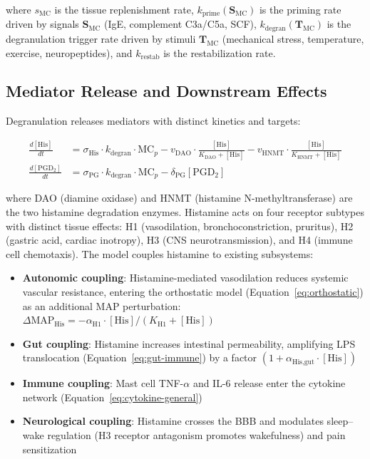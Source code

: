 where $s_{\text{MC}}$ is the tissue replenishment rate, $k_{\text{prime}}(\boldsymbol{S}_{\text{MC}})$ is the priming rate driven by signals $\boldsymbol{S}_{\text{MC}}$ (IgE, complement C3a/C5a, SCF), $k_{\text{degran}}(\boldsymbol{T}_{\text{MC}})$ is the degranulation trigger rate driven by stimuli $\boldsymbol{T}_{\text{MC}}$ (mechanical stress, temperature, exercise, neuropeptides), and $k_{\text{restab}}$ is the restabilization rate.

\subsection{Mediator Release and Downstream Effects}

Degranulation releases mediators with distinct kinetics and targets:

\begin{align}
\label{eq:histamine-dynamics}
\frac{d[\text{His}]}{dt} &= \sigma_{\text{His}} \cdot k_{\text{degran}} \cdot \text{MC}_p - v_{\text{DAO}} \cdot \frac{[\text{His}]}{K_{\text{DAO}} + [\text{His}]} - v_{\text{HNMT}} \cdot \frac{[\text{His}]}{K_{\text{HNMT}} + [\text{His}]} \\
\frac{d[\text{PGD}_2]}{dt} &= \sigma_{\text{PG}} \cdot k_{\text{degran}} \cdot \text{MC}_p - \delta_{\text{PG}} [\text{PGD}_2]
\end{align}

where DAO (diamine oxidase) and HNMT (histamine N-methyltransferase) are the two histamine degradation enzymes. Histamine acts on four receptor subtypes with distinct tissue effects: H1 (vasodilation, bronchoconstriction, pruritus), H2 (gastric acid, cardiac inotropy), H3 (CNS neurotransmission), and H4 (immune cell chemotaxis). The model couples histamine to existing subsystems:

\begin{itemize}
    \item \textbf{Autonomic coupling}: Histamine-mediated vasodilation reduces systemic vascular resistance, entering the orthostatic model (Equation~\ref{eq:orthostatic}) as an additional MAP perturbation: $\Delta\text{MAP}_{\text{His}} = -\alpha_{\text{H1}} \cdot [\text{His}] / (K_{\text{H1}} + [\text{His}])$
    \item \textbf{Gut coupling}: Histamine increases intestinal permeability, amplifying LPS translocation (Equation~\ref{eq:gut-immune}) by a factor $(1 + \alpha_{\text{His,gut}} \cdot [\text{His}])$
    \item \textbf{Immune coupling}: Mast cell TNF-$\alpha$ and IL-6 release enter the cytokine network (Equation~\ref{eq:cytokine-general})
    \item \textbf{Neurological coupling}: Histamine crosses the BBB and modulates sleep--wake regulation (H3 receptor antagonism promotes wakefulness) and pain sensitization
\end{itemize}

